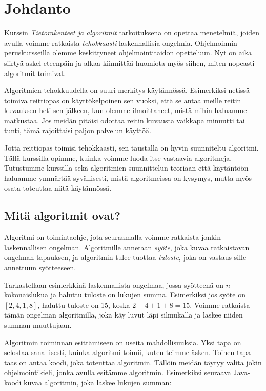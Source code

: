 \chapter{Johdanto}

Kurssin \emph{Tietorakenteet ja algoritmit} tarkoituksena
on opettaa menetelmiä, joiden avulla voimme ratkaista
\emph{tehokkaasti} laskennallisia ongelmia.
Ohjelmoinnin peruskursseilla olemme keskittyneet
ohjelmointitaidon opetteluun.
Nyt on aika siirtyä askel eteenpäin ja alkaa kiinnittää
huomiota myös siihen, miten nopeasti algoritmit toimivat.

Algoritmien tehokkuudella on suuri merkitys käytännössä.
Esimerkiksi netissä toimiva reittiopas on käyttökelpoinen sen vuoksi,
että se antaa meille reitin kuvauksen heti sen jälkeen, kun olemme
ilmoittaneet, mistä mihin haluamme matkustaa.
Jos meidän pitäisi odottaa reitin kuvausta vaikkapa minuutti tai tunti,
tämä rajoittaisi paljon palvelun käyttöä.

Jotta reittiopas toimisi tehokkaasti, sen taustalla on
hyvin suunniteltu algoritmi.
Tällä kurssilla opimme, kuinka voimme luoda itse vastaavia algoritmeja.
Tutustumme kurssilla sekä algoritmien suunnittelun teoriaan että
käytäntöön -- haluamme ymmärtää syvällisesti, mistä algoritmeissa on kysymys,
mutta myös osata toteuttaa niitä käytännössä.

\section{Mitä algoritmit ovat?}


Algoritmi on toimintaohje, jota seuraamalla voimme ratkaista
jonkin laskennallisen ongelman.
Algoritmille annetaan \emph{syöte},
joka kuvaa ratkaistavan ongelman tapauksen,
ja algoritmin tulee tuottaa \emph{tuloste},
joka on vastaus sille annettuun syötteeseen.

Tarkastellaan esimerkkinä laskennallista ongelmaa,
jossa syötteenä on $n$ kokonaislukua ja haluttu
tuloste on lukujen summa.
Esimerkiksi jos syöte on $[2,4,1,8]$,
haluttu tuloste on 15, koska $2+4+1+8=15$.
Voimme ratkaista tämän ongelman algoritmilla,
joka käy luvut läpi silmukalla ja laskee niiden
summan muuttujaan.

Algoritmin toiminnan esittämiseen on useita mahdollisuuksia.
Yksi tapa on selostaa sanallisesti, kuinka algoritmi toimii,
kuten teimme äsken.
Toinen tapa taas on antaa koodi, joka toteuttaa algoritmin.
Tällöin meidän täytyy valita jokin ohjelmointikieli,
jonka avulla esitämme algoritmin.
Esimerkiksi seuraava Java-koodi kuvaa algoritmin,
joka laskee lukujen summan:

